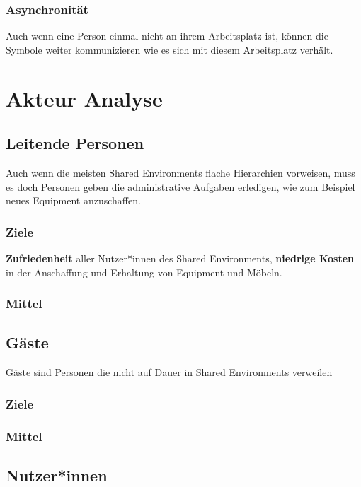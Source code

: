 \documentclass{article}
\begin{document}
\subsubsection*{Asynchronität}
Auch wenn eine Person einmal nicht an ihrem Arbeitsplatz ist, können die Symbole weiter kommunizieren wie es sich mit diesem Arbeitsplatz verhält.

\section{Akteur Analyse}


\subsection{Leitende Personen}

Auch wenn die meisten Shared Environments flache Hierarchien vorweisen, muss es doch Personen geben die administrative Aufgaben erledigen, wie zum Beispiel neues Equipment anzuschaffen.

\subsubsection*{Ziele}

\textbf{Zufriedenheit} aller Nutzer*innen des Shared Environments, \textbf{niedrige Kosten} in der Anschaffung und Erhaltung von Equipment und Möbeln.

\subsubsection*{Mittel}

\subsection{Gäste}

Gäste sind Personen die nicht auf Dauer in Shared Environments verweilen

\subsubsection*{Ziele}
\subsubsection*{Mittel}

\subsection{Nutzer*innen}
\end{document}
